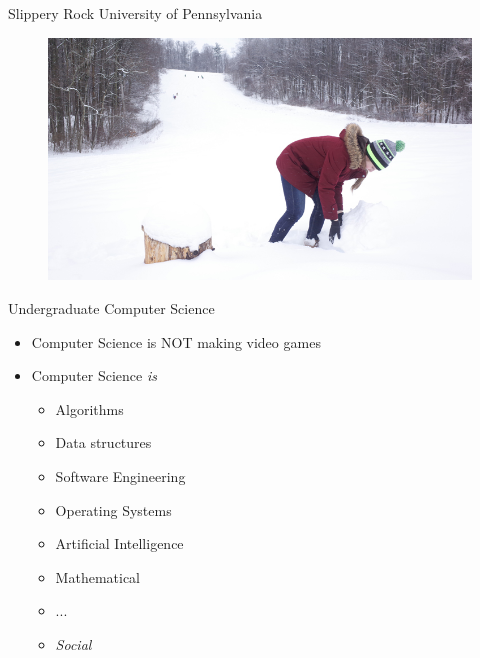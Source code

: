 \documentclass{beamer}
\begin{document}
\begin{frame}{Slippery Rock University of Pennsylvania}
\begin{figure}
	\includegraphics[width=\linewidth]{img/sru3.jpg}
\end{figure}
\end{frame}

\begin{frame}{Undergraduate Computer Science}
\begin{itemize}
	\item Computer Science is NOT making video games
	\item Computer Science \emph{is}
	\begin{itemize}
		\item Algorithms
		\item Data structures
		\item Software Engineering
		\item Operating Systems
		\item Artificial Intelligence
		\item Mathematical
		\item ...
		\item \emph{Social}
	\end{itemize}
\end{itemize}
\end{frame}
\end{document}
